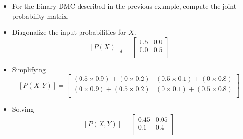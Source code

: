 \documentclass[a4paper,12pt]{article}
\begin{document}
\begin{itemize}
\item For the Binary DMC described in the previous example, compute the joint probability matrix.
\item Diagonalize the input probabilities for $X$.
\[  [P(X)]_d  = \left[ \begin{array}{cc}
0.5 & 0.0  \\
0.0 & 0.5\\
\end{array} \right] \]

\item Simplifying
\[  [P(X,Y)]  =  \left[ \begin{array}{cc}
(0.5 \times 0.9)+(0 \times 0.2) & (0.5 \times 0.1)+(0 \times 0.8) \\
(0 \times 0.9)+(0.5 \times 0.2) & (0 \times 0.1)+(0.5 \times 0.8) \\
\end{array} \right]  \]


\item Solving
\[  [P(X,Y)]  =  \left[ \begin{array}{cc}
0.45 & 0.05 \\
0.1  & 0.4 \\
\end{array} \right]  \]
\end{itemize}
\end{document}
